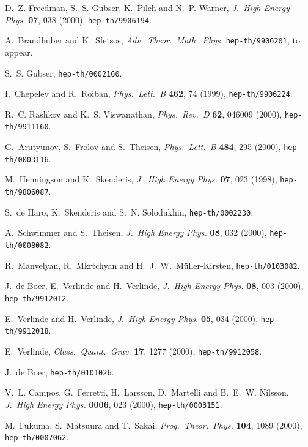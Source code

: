 \documentclass[a4paper,12pt]{article}
\begin{document}
\begin{thebibliography}{10}
D.~Z. Freedman, S.~S. Gubser, K.~Pilch and N.~P. Warner, \emph{J.~High Energy
  Phys.} \textbf{07}, 038 (2000), \texttt{hep-th/9906194}.

A.~Brandhuber and K.~Sfetsos, \emph{Adv.~Theor.~Math.~Phys.}
  \texttt{hep-th/9906201}, to appear.

S.~S. Gubser, \texttt{hep-th/0002160}.

I.~Chepelev and R.~Roiban, \emph{Phys.~Lett.~B} \textbf{462}, 74
  (1999), \texttt{hep-th/9906224}.

R.~C. Rashkov and K.~S. Viswanathan, \emph{Phys.~Rev.~D} \textbf{62}, 046009
  (2000), \texttt{hep-th/9911160}.

G.~Arutyunov, S.~Frolov and S.~Theisen, \emph{Phys.~Lett.~B} \textbf{484}, 295
  (2000), \texttt{hep-th/0003116}.

M.~Henningson and K.~Skenderis, \emph{J.~High Energy Phys.} \textbf{07}, 023
  (1998), \texttt{hep-th/9806087}.

S.~{de Haro}, K.~Skenderis and S.~N. Solodukhin, \texttt{hep-th/0002230}.

A.~Schwimmer and S.~Theisen, \emph{J.~High Energy Phys.} 
  \textbf{08}, 032 (2000), \texttt{hep-th/0008082}.

R.~Manvelyan, R.~Mkrtchyan and H.~J.~W.~M{\"u}ller-Kirsten,
  \texttt{hep-th/0103082}.

J.~{de Boer}, E.~Verlinde and H.~Verlinde, \emph{J.~High Energy Phys.}
  \textbf{08}, 003 (2000), \texttt{hep-th/9912012}.

E.~Verlinde and H.~Verlinde, \emph{J.~High Energy Phys.} \textbf{05}, 034
  (2000), \texttt{hep-th/9912018}.

E.~Verlinde, \emph{Class.~Quant.~Grav.} \textbf{17}, 1277 (2000),
  \texttt{hep-th/9912058}. 

J.~{de Boer}, \texttt{hep-th/0101026}.

V.~L. Campos, G.~Ferretti, H.~Larsson, D.~Martelli and B.~E.~W. Nilsson,
  \emph{J.~High Energy Phys.} \textbf{0006}, 023 (2000),
  \texttt{hep-th/0003151}.

M.~Fukuma, S.~Matsuura and T.~Sakai, \emph{Prog.~Theor.~Phys.}
\textbf{104}, 1089 (2000), \texttt{hep-th/0007062}.


\end{thebibliography}
\end{document}
